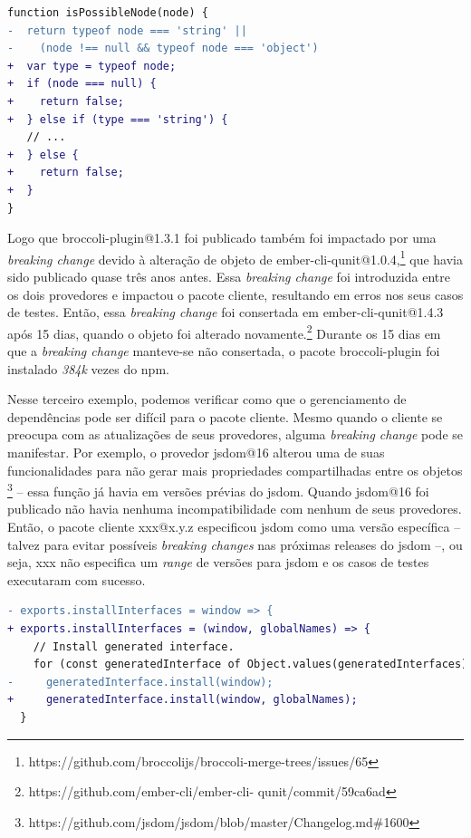 \begin{lstlisting}[numbers=none, language=diff, label=cod:bc:ember_2, caption={broccoli-plugin@1.3.1 validation function enhanced.}]
 function isPossibleNode(node) {
-  return typeof node === 'string' ||
-    (node !== null && typeof node === 'object')
+  var type = typeof node;
+  if (node === null) {
+    return false;
+  } else if (type === 'string') {
   // ...
+  } else {
+    return false;
+  }
}
\end{lstlisting}

Logo que \textsf{broccoli-plugin@1.3.1} foi publicado também foi impactado por uma \textit{breaking change} devido à alteração de objeto de \textsf{ember-cli-qunit@1.0.4},\footnote{https://github.com/broccolijs/broccoli-merge-trees/issues/65} que havia sido publicado quase três anos antes. Essa \textit{breaking change} foi introduzida entre os dois provedores e impactou o pacote cliente, resultando em erros nos seus casos de testes. Então, essa \textit{breaking change} foi consertada em \textsf{ember-cli-qunit@1.4.3} após 15 dias, quando o objeto foi alterado novamente.\footnote{https://github.com/ember-cli/ember-cli-
qunit/commit/59ca6ad} Durante os 15 dias em que a \textit{breaking change} manteve-se não consertada, o pacote \textsf{broccoli-plugin} foi instalado \textit{384k} vezes do \textsf{npm}.

Nesse terceiro exemplo, podemos verificar como que o gerenciamento de dependências pode ser difícil para o pacote cliente. Mesmo quando o cliente se preocupa com as atualizações de seus provedores, alguma \textit{breaking change} pode se manifestar. Por exemplo, o provedor \textsf{jsdom@16} alterou uma de suas funcionalidades para não gerar mais propriedades compartilhadas entre os objetos \footnote{https://github.com/jsdom/jsdom/blob/master/Changelog.md\#1600} -- essa função já havia em versões prévias do \textsf{jsdom}. Quando \textsf{jsdom@16} foi publicado não havia nenhuma incompatibilidade com nenhum de seus provedores. Então, o pacote cliente \textsf{xxx@x.y.z} especificou \textsf{jsdom} como uma versão específica -- talvez para evitar possíveis \textit{breaking changes} nas próximas releases do \textsf{jsdom} --, ou seja, \textsf{xxx} não especifica um \textit{range} de versões para \textsf{jsdom} e os casos de testes executaram com sucesso.

\begin{lstlisting}[numbers=none, language=diff, label=cod:bc:jsdom, caption={\textsf{jsdom@16.3} corrige a função \texttt{installInterface}}]
- exports.installInterfaces = window => {
+ exports.installInterfaces = (window, globalNames) => {
    // Install generated interface.
    for (const generatedInterface of Object.values(generatedInterfaces)) {
-     generatedInterface.install(window);
+     generatedInterface.install(window, globalNames);
  }
\end{lstlisting}

